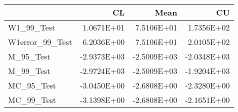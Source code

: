 \begin{tabular}{lrrr}
\toprule
{} &          CL &        Mean &          CU \\
\midrule
W1\_99\_Test      &  1.0671E+01 &  7.5106E+01 &  1.7356E+02 \\
W1error\_99\_Test &  6.2036E+00 &  7.5106E+01 &  2.0105E+02 \\
M\_95\_Test       & -2.9373E+03 & -2.5009E+03 & -2.0348E+03 \\
M\_99\_Test       & -2.9724E+03 & -2.5009E+03 & -1.9204E+03 \\
MC\_95\_Test      & -3.0450E+00 & -2.6808E+00 & -2.3280E+00 \\
MC\_99\_Test      & -3.1398E+00 & -2.6808E+00 & -2.1651E+00 \\
\bottomrule
\end{tabular}
